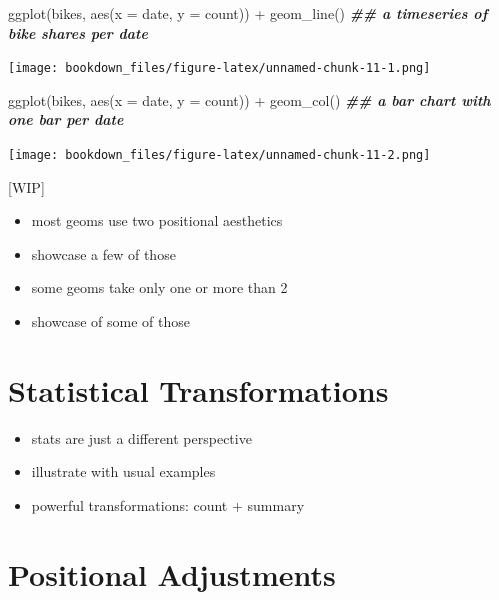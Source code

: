 \documentclass[
]{krantz}
\makeatletter
\newenvironment{Shaded}{\begin{snugshade}}{\end{snugshade}}
\newcommand{\AttributeTok}[1]{\textcolor[rgb]{0.61,0.61,0.61}{#1}}
\newcommand{\DocumentationTok}[1]{\textcolor[rgb]{0.37,0.37,0.37}{\textbf{\textit{#1}}}}
\newcommand{\FunctionTok}[1]{\textcolor[rgb]{0,0,0}{#1}}
\newcommand{\NormalTok}[1]{#1}
\newcommand{\SpecialCharTok}[1]{\textcolor[rgb]{0,0,0}{#1}}
\providecommand{\tightlist}{%
  \setlength{\itemsep}{0pt}\setlength{\parskip}{0pt}}
\newenvironment{kframe}{%
\medskip{}
\setlength{\fboxsep}{.8em}
 \def\at@end@of@kframe{}%
 \ifinner\ifhmode%
  \def\at@end@of@kframe{\end{minipage}}%
  \begin{minipage}{\columnwidth}%
 \fi\fi%
 \def\FrameCommand##1{\hskip\@totalleftmargin \hskip-\fboxsep
 \colorbox{shadecolor}{##1}\hskip-\fboxsep
     \hskip-\linewidth \hskip-\@totalleftmargin \hskip\columnwidth}%
 \MakeFramed {\advance\hsize-\width
   \@totalleftmargin\z@ \linewidth\hsize
   \@setminipage}}%
 {\par\unskip\endMakeFramed%
 \at@end@of@kframe}
\renewenvironment{Shaded}{\begin{kframe}}{\end{kframe}}
\makeatother
\begin{document}
\begin{Shaded}
\begin{Highlighting}[]
\FunctionTok{ggplot}\NormalTok{(bikes, }\FunctionTok{aes}\NormalTok{(}\AttributeTok{x =}\NormalTok{ date, }\AttributeTok{y =}\NormalTok{ count)) }\SpecialCharTok{+}
  \FunctionTok{geom\_line}\NormalTok{() }\DocumentationTok{\#\# a timeseries of bike shares per date}
\end{Highlighting}
\end{Shaded}

\texttt{[image: bookdown\_files/figure-latex/unnamed-chunk-11-1.png]}

\begin{Shaded}
\begin{Highlighting}[]
\FunctionTok{ggplot}\NormalTok{(bikes, }\FunctionTok{aes}\NormalTok{(}\AttributeTok{x =}\NormalTok{ date, }\AttributeTok{y =}\NormalTok{ count)) }\SpecialCharTok{+}
  \FunctionTok{geom\_col}\NormalTok{() }\DocumentationTok{\#\# a bar chart with one bar per date}
\end{Highlighting}
\end{Shaded}

\texttt{[image: bookdown\_files/figure-latex/unnamed-chunk-11-2.png]}

{[}WIP{]}

\begin{itemize}
\tightlist
\item
  most geoms use two positional aesthetics
\item
  showcase a few of those
\item
  some geoms take only one or more than 2
\item
  showcase of some of those
\end{itemize}

\hypertarget{statistical-transformations}{%
\section{Statistical Transformations}\label{statistical-transformations}}

\begin{itemize}
\tightlist
\item
  stats are just a different perspective
\item
  illustrate with usual examples
\item
  powerful transformations: count + summary
\end{itemize}

\hypertarget{positional-adjustments}{%
\section{Positional Adjustments}\label{positional-adjustments}}
\end{document}
